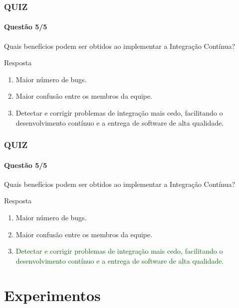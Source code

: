 \documentclass[
	9pt, %
	t, %
]{beamer}
\begin{document}
\begin{frame}
	\frametitle{QUIZ}
	\framesubtitle{Questão 5/5}

	{\Large Quais benefícios podem ser obtidos ao implementar a Integração Contínua? }

	\begin{exampleblock}{Resposta}
		\begin{enumerate}[a]
			\item Maior número de bugs.
			\item Maior confusão entre os membros da equipe.
			\item Detectar e corrigir problemas de integração mais cedo, facilitando o desenvolvimento contínuo e a entrega de software de alta qualidade.
		\end{enumerate}
	\end{exampleblock}

\end{frame}

\begin{frame}
	\frametitle{QUIZ}
	\framesubtitle{Questão 5/5}

	{\Large Quais benefícios podem ser obtidos ao implementar a Integração Contínua? }

	\begin{exampleblock}{Resposta}
		\begin{enumerate}[a]
			\item Maior número de bugs.
			\item Maior confusão entre os membros da equipe.
			\item \textcolor{darkgreen}{Detectar e corrigir problemas de integração mais cedo, facilitando o desenvolvimento contínuo e a entrega de software de alta qualidade.}
		\end{enumerate}
	\end{exampleblock}

\end{frame}


\section{Experimentos}
\end{document}

